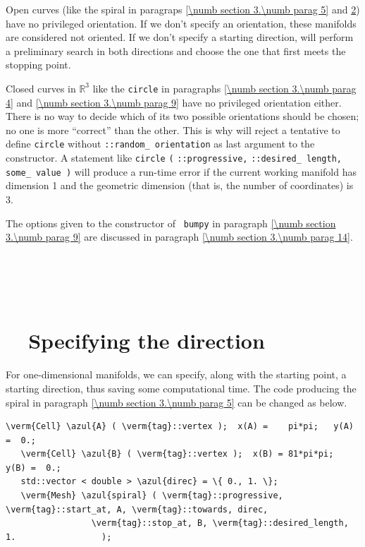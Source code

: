 Open curves (like the spiral in paragraps \ref{\numb section 3.\numb parag 5} and
\ref{\numb section 3.\numb parag 12}) have no privileged orientation.
If we don't specify an orientation, these manifolds are considered not oriented.
If we don't specify a starting direction, {\maniFEM} will perform a preliminary search
in both directions and choose the one that first meets the stopping point.

Closed curves in $ \mathbb{R}^3 $ like the {\small\tt circle} in paragraphs
\ref{\numb section 3.\numb parag 4} and \ref{\numb section 3.\numb parag 9}
have no privileged orientation either.
There is no way to decide which of its two possible orientations
should be chosen; no one is more ``correct'' than the other.
This is why {\maniFEM} will reject a tentative to define {\small\tt circle} without
{\small\tt {}::random\_\,orientation} as last argument to the {\small\tt {}} constructor.
A statement like {\small\tt {}} {\small\tt circle} {\small\tt (}
{\small\tt {}::progressive,} {\small\tt{}::desired\_\,length,}
{\small\tt some\_\,value )}
will produce a run-time error if the current working manifold has dimension 1 and
the geometric dimension (that is, the number of coordinates) is 3.

The options given to the constructor of {\small\tt {} bumpy} in paragraph
\ref{\numb section 3.\numb parag 9} are discussed in paragraph
\ref{\numb section 3.\numb parag 14}.


\section{~~\cinza{[empty]}}\label{\numb section 3.\numb parag 11}


\section{~~Specifying the direction}\label{\numb section 3.\numb parag 12}

For one-dimensional manifolds, we can specify, along with the starting point,
a starting direction, thus saving some computational time.
The code producing the spiral in paragraph \ref{\numb section 3.\numb parag 5}
can be changed as below.

\begin{Verbatim}[commandchars=\\\{\},formatcom=\small\tt,frame=single,
   label=parag-\ref{\numb section 3.\numb parag 12}.cpp,rulecolor=\color{coment},
   baselinestretch=0.94,framesep=2mm                                            ]
   \verm{Cell} \azul{A} ( \verm{tag}::vertex );  x(A) =    pi*pi;   y(A) =  0.;
   \verm{Cell} \azul{B} ( \verm{tag}::vertex );  x(B) = 81*pi*pi;   y(B) =  0.;
   std::vector < double > \azul{direc} = \{ 0., 1. \};
   \verm{Mesh} \azul{spiral} ( \verm{tag}::progressive, \verm{tag}::start_at, A, \verm{tag}::towards, direc,
                 \verm{tag}::stop_at, B, \verm{tag}::desired_length, 1.                 );
\end{Verbatim}

